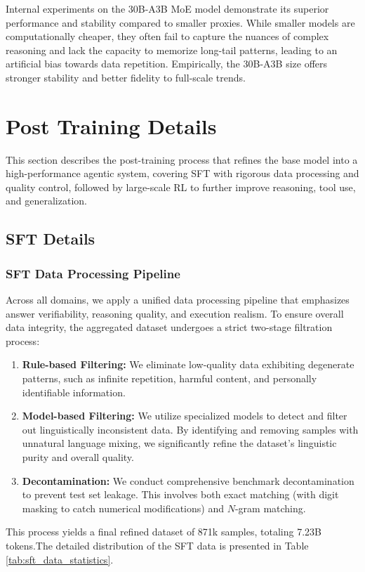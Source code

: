 Internal experiments on the 30B-A3B MoE model demonstrate its superior performance and stability compared to smaller proxies.
While smaller models are computationally cheaper, they often fail to capture the nuances of complex reasoning and lack the capacity to memorize long-tail patterns, leading to an artificial bias towards data repetition.
Empirically, the 30B-A3B size offers stronger stability and better fidelity to full-scale trends.


\section{Post Training Details}
This section describes the post-training process that refines the base model into a high-performance agentic system, covering SFT with rigorous data processing and quality control, followed by large-scale RL to further improve reasoning, tool use, and generalization.

\subsection{SFT Details}
\subsubsection{SFT Data Processing Pipeline}
Across all domains, we apply a unified data processing pipeline that emphasizes answer verifiability, reasoning quality, and execution realism. To ensure overall data integrity, the aggregated dataset undergoes a strict two-stage filtration process:
\begin{enumerate}
\item \textbf{Rule-based Filtering:} We eliminate low-quality data exhibiting degenerate patterns, such as infinite repetition, harmful content, and personally identifiable information.
\item \textbf{Model-based Filtering:} We utilize specialized models to detect and filter out linguistically inconsistent data. By identifying and removing samples with unnatural language mixing, we significantly refine the dataset's linguistic purity and overall quality.
\item \textbf{Decontamination:} We conduct comprehensive benchmark decontamination to prevent test set leakage. This involves both exact matching (with digit masking to catch numerical modifications) and $N$-gram matching.

\end{enumerate}
This process yields a final refined dataset of 871k samples, totaling 7.23B tokens.The detailed distribution of the SFT data is presented in Table \ref{tab:sft_data_statistics}.


